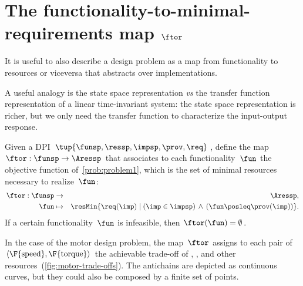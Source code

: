 

\section{The functionality-to-minimal-requirements map $\ftor$}

It is useful to also describe a design problem as a map from functionality
to resources or viceversa that abstracts over implementations.

A useful analogy is the state space representation \emph{vs} the
transfer function representation of a linear time-invariant system:
the state space representation is richer, but we only need the transfer
function to characterize the input-output response.


\begin{definition}
    \label{def:ftor}Given a DPI $\tup{ \funsp,\ressp,\impsp,\prov,\req} $,
    define the map~$\ftor:\funsp\rightarrow\Aressp$ that associates
    to each functionality~$\fun$ the objective function of~\cref{prob:problem1},
    which is the set of minimal resources necessary to realize~$\fun$:
    \begin{eqnarray*}
        \ftor:\funsp & \rightarrow & \Aressp,\\
        \fun& \mapsto & \resMin\{\req(\imp)\mid\left(\imp\in\impsp\right)\,\wedge\,\left(\fun\posleq\prov(\imp)\right)\}.
    \end{eqnarray*}
    If a certain functionality~$\fun$ is infeasible, then $\ftor(\fun)=\emptyset$.
\end{definition}



\begin{example}
    In the case of the motor design problem, the map~$\ftor$ assigns
    to each pair of $\left\langle \F{\text{speed}},\F{\text{torque}}\right\rangle $
    the achievable trade-off of , , and other resources~(\cref{fig:motor-trade-offs}).
    The antichains are depicted as continuous curves, but they could also
    be composed by a finite set of points.

\end{example}

